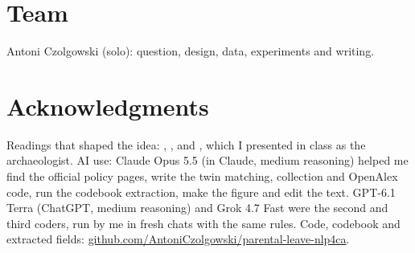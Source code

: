 \documentclass[10pt,twocolumn]{article}
\begin{document}
\section*{Team}
Antoni Czolgowski (solo): question, design, data, experiments and writing.

\section*{Acknowledgments}
Readings that shaped the idea: \citet{gligoric2025}, \citet{bamman2024}, \citet{than2025} and \citet{karpinska2024}, which I presented in class as the archaeologist. AI use: Claude Opus 5.5 (in Claude, medium reasoning) helped me find the official policy pages, write the twin matching, collection and OpenAlex code, run the codebook extraction, make the figure and edit the text. GPT-6.1 Terra (ChatGPT, medium reasoning) and Grok 4.7 Fast were the second and third coders, run by me in fresh chats with the same rules. Code, codebook and extracted fields: \url{github.com/AntoniCzolgowski/parental-leave-nlp4ca}.
\end{document}
